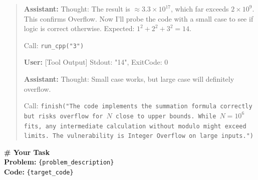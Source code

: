 \documentclass[11pt]{article}
\begin{document}
\begin{promptbox}
\begin{quote}
\textbf{Assistant:}
Thought: The result is $\approx 3.3 \times 10^{17}$, which far exceeds $2 \times 10^9$. This confirms Overflow. Now I'll probe the code with a small case to see if logic is correct otherwise. Expected: $1^2+2^2+3^2 = 14$.

Call: \texttt{run\_cpp("3")}

\textbf{User:} [Tool Output] Stdout: "14", ExitCode: 0

\textbf{Assistant:}
Thought: Small case works, but large case will definitely overflow.

Call: \texttt{finish("The code implements the summation formula correctly but risks overflow for $N$ close to upper bounds. While $N=10^6$ fits, any intermediate calculation without modulo might exceed limits. The vulnerability is Integer Overflow on large inputs.")}
\end{quote}

\vspace{0.5em}
\noindent\textbf{\# Your Task} \\
\textbf{Problem:} \texttt{\{problem\_description\}} \\
\textbf{Code:} \texttt{\{target\_code\}}
\end{promptbox}
\end{document}
